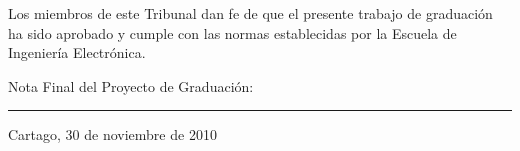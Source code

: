 \vfill


Los miembros de este Tribunal dan fe de que el presente trabajo de graduación
ha sido aprobado y cumple con las normas establecidas por la Escuela de
Ingeniería Electrónica.

\vfill

\begin{center}
  Nota Final del Proyecto de Graduación: \rule{5cm}{0.5pt}
\end{center}
\vfill

\begin{center}
  Cartago, 30 de noviembre de 2010\par
\end{center}

\cleardoublepage

